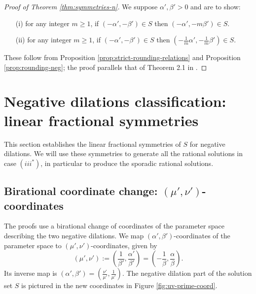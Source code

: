 \documentclass[11pt, letterpaper, reqno]{amsart}
\theoremstyle{definition}
\theoremstyle{remark}
\numberwithin{equation}{section}
\newcommand{\uu}{{\mu'}}
\newcommand{\vv}{{\nu'}}
\newcommand{\alphap}{{\alpha'}}
\newcommand{\betap}{{\beta'}}
\begin{document}
\begin{proof}[Proof of Theorem \ref{thm:symmetries-n}]
We suppose $\alphap, \betap > 0$ and are to show:
\begin{enumerate}
\item[(i)]  for any integer $m\geq 1$,  if $(-\alphap, -\betap) \in S$  then $( -\alphap, -{m}\betap)\in S$.
\item[(ii)]  for any integer $m\geq 1$,  if $(-\alphap, -\betap) \in S$  then 
$(-\frac{1}{m}{\alphap}, -\frac{1}{m}\betap) \in S$.
\end{enumerate}
These follow from Proposition \ref{prop:strict-rounding-relations}
and Proposition \ref{prop:rounding-neg};
the proof parallels that of Theorem 2.1 in \cite[p.~285]{LagR:2018a}.
\end{proof}



%
%
\section{Negative dilations classification: linear fractional symmetries}
\label{sec:negative-LFS}

This section   establishes the linear fractional symmetries of $S$ for negative dilations.
We will use these symmetries to generate all the rational solutions in case  $(iii^{\ast})$,
in particular to produce the sporadic rational solutions.


%
%
\subsection{Birational coordinate change: $(\uu,\vv)$-coordinates} \label{sec:birational-1} 

The proofs use  a birational change
of coordinates of the parameter space describing the two
negative dilations.
We map  $(\alphap, \betap)$-coordinates of the parameter space to
$(\uu, \vv)$-coordinates, given by 
\begin{equation}\label{eqn:uv-prime-coord}
(\uu,\vv) := \left( \frac{1}{\betap}, \frac{\alphap}{\betap} \right) = \left( -\frac{1}{\beta}, \frac{\alpha}{\beta} \right).
\end{equation}
Its inverse map is  
$(\alphap, \betap) = \left( \frac{\vv}{\uu}, \frac{1}{\uu} \right) $.
The negative dilation part of the solution set $S$ 
is pictured  in the new coordinates  in 
Figure \ref{fig:uv-prime-coord}.
\end{document}
